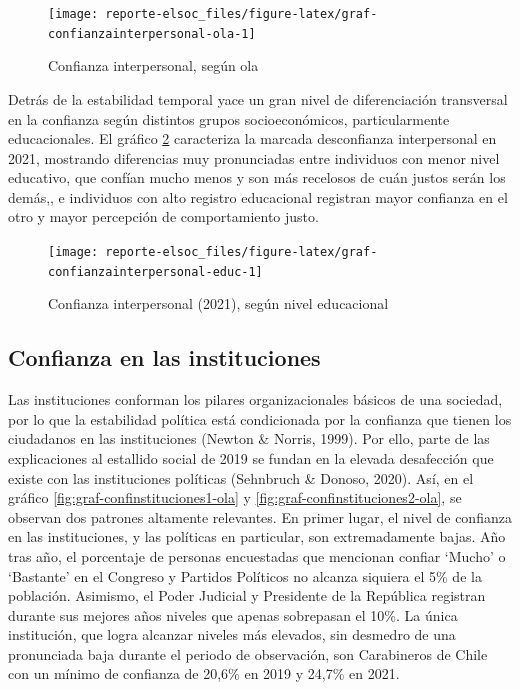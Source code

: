 \documentclass[
  12pt,
]{book}
\begin{document}
\begin{figure}

{\centering \texttt{[image: reporte-elsoc\_files/figure-latex/graf-confianzainterpersonal-ola-1]} 

}

\caption{Confianza interpersonal, según ola}\label{fig:graf-confianzainterpersonal-ola}
\end{figure}

Detrás de la estabilidad temporal yace un gran nivel de diferenciación transversal en la confianza según distintos grupos socioeconómicos, particularmente educacionales. El gráfico \ref{fig:graf-confianzainterpersonal-educ} caracteriza la marcada desconfianza interpersonal en 2021, mostrando diferencias muy pronunciadas entre individuos con menor nivel educativo, que confían mucho menos y son más recelosos de cuán justos serán los demás,, e individuos con alto registro educacional registran mayor confianza en el otro y mayor percepción de comportamiento justo.

\begin{figure}

{\centering \texttt{[image: reporte-elsoc\_files/figure-latex/graf-confianzainterpersonal-educ-1]} 

}

\caption{Confianza interpersonal (2021), según nivel educacional}\label{fig:graf-confianzainterpersonal-educ}
\end{figure}

\hypertarget{confianza-en-las-instituciones}{%
\subsection*{Confianza en las instituciones}\label{confianza-en-las-instituciones}}

Las instituciones conforman los pilares organizacionales básicos de una sociedad, por lo que la estabilidad política está condicionada por la confianza que tienen los ciudadanos en las instituciones (Newton \& Norris, 1999). Por ello, parte de las explicaciones al estallido social de 2019 se fundan en la elevada desafección que existe con las instituciones políticas (Sehnbruch \& Donoso, 2020). Así, en el gráfico \ref{fig:graf-confinstituciones1-ola} y \ref{fig:graf-confinstituciones2-ola}, se observan dos patrones altamente relevantes. En primer lugar, el nivel de confianza en las instituciones, y las políticas en particular, son extremadamente bajas. Año tras año, el porcentaje de personas encuestadas que mencionan confiar `Mucho' o `Bastante' en el Congreso y Partidos Políticos no alcanza siquiera el 5\% de la población. Asimismo, el Poder Judicial y Presidente de la República registran durante sus mejores años niveles que apenas sobrepasan el 10\%. La única institución, que logra alcanzar niveles más elevados, sin desmedro de una pronunciada baja durante el periodo de observación, son Carabineros de Chile con un mínimo de confianza de 20,6\% en 2019 y 24,7\% en 2021.
\end{document}
